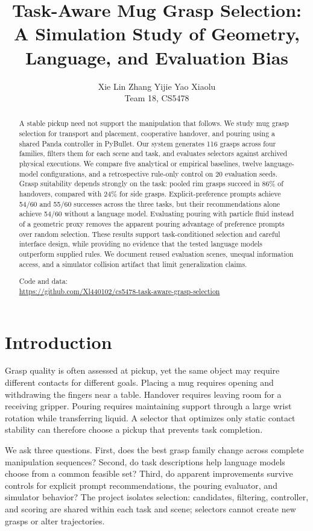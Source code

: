 \documentclass{article}
\title{Task-Aware Mug Grasp Selection:\\A Simulation Study of Geometry, Language, and Evaluation Bias}
\author{Xie Lin \qquad Zhang Yijie \qquad Yao Xiaolu\\Team 18, CS5478}
\begin{document}
\maketitle

\begin{abstract}
A stable pickup need not support the manipulation that follows. We study mug grasp selection for transport and placement, cooperative handover, and pouring using a shared Panda controller in PyBullet. Our system generates 116 grasps across four families, filters them for each scene and task, and evaluates selectors against archived physical executions. We compare five analytical or empirical baselines, twelve language-model configurations, and a retrospective rule-only control on 20 evaluation seeds. Grasp suitability depends strongly on the task: pooled rim grasps succeed in 86\% of handovers, compared with 24\% for side grasps. Explicit-preference prompts achieve 54/60 and 55/60 successes across the three tasks, but their recommendations alone achieve 54/60 without a language model. Evaluating pouring with particle fluid instead of a geometric proxy removes the apparent pouring advantage of preference prompts over random selection. These results support task-conditioned selection and careful interface design, while providing no evidence that the tested language models outperform supplied rules. We document reused evaluation scenes, unequal information access, and a simulator collision artifact that limit generalization claims.
\par\smallskip\noindent Code and data:\\\url{https://github.com/Xl440102/cs5478-task-aware-grasp-selection}
\end{abstract}

\section{Introduction}
Grasp quality is often assessed at pickup, yet the same object may require different contacts for different goals. Placing a mug requires opening and withdrawing the fingers near a table. Handover requires leaving room for a receiving gripper. Pouring requires maintaining support through a large wrist rotation while transferring liquid. A selector that optimizes only static contact stability can therefore choose a pickup that prevents task completion.

We ask three questions. First, does the best grasp family change across complete manipulation sequences? Second, do task descriptions help language models choose from a common feasible set? Third, do apparent improvements survive controls for explicit prompt recommendations, the pouring evaluator, and simulator behavior? The project isolates selection: candidates, filtering, controller, and scoring are shared within each task and scene; selectors cannot create new grasps or alter trajectories.
\end{document}
